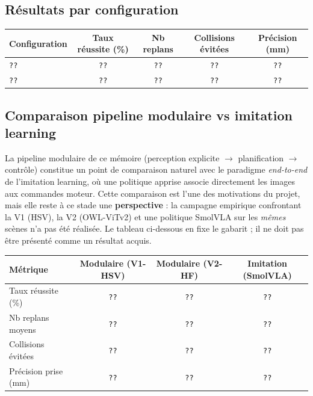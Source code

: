 \subsection{Résultats par configuration}


\begin{center}
\begin{tabular}{lcccc}
\toprule
Configuration & Taux réussite (\%) & Nb replans & Collisions évitées & Précision (mm) \\
\midrule
\texttt{??} & \texttt{??} & \texttt{??} & \texttt{??} & \texttt{??} \\
\texttt{??} & \texttt{??} & \texttt{??} & \texttt{??} & \texttt{??} \\
\bottomrule
\end{tabular}
\end{center}

\subsection{Comparaison pipeline modulaire vs imitation learning}

La pipeline modulaire de ce mémoire (perception explicite $\to$ planification
$\to$ contrôle) constitue un point de comparaison naturel avec le paradigme
\emph{end-to-end} de l'imitation learning, où une politique apprise associe
directement les images aux commandes moteur. Cette comparaison est l'une des
motivations du projet, mais elle reste à ce stade une \textbf{perspective} : la
campagne empirique confrontant la V1 (HSV), la V2 (OWL-ViTv2) et une politique
SmolVLA sur les \emph{mêmes} scènes n'a pas été réalisée. Le tableau ci-dessous
en fixe le gabarit ; il ne doit pas être présenté comme un résultat acquis.


\begin{center}
\begin{tabular}{lccc}
\toprule
Métrique & Modulaire (V1-HSV) & Modulaire (V2-HF) & Imitation (SmolVLA) \\
\midrule
Taux réussite (\%)   & \texttt{??} & \texttt{??} & \texttt{??} \\
Nb replans moyens    & \texttt{??} & \texttt{??} & \texttt{??} \\
Collisions évitées   & \texttt{??} & \texttt{??} & \texttt{??} \\
Précision prise (mm) & \texttt{??} & \texttt{??} & \texttt{??} \\
\bottomrule
\end{tabular}
\end{center}

